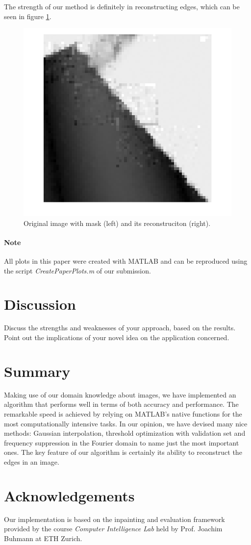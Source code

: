 \documentclass[10pt,conference,compsocconf]{IEEEtran}
\begin{document}
The strength of our method is definitely in reconstructing edges, which can be seen in figure \ref{edge_reconstruction}.

\begin{figure}
\centering
\includegraphics[width=\columnwidth]{images/framing_artifacts.png}
\caption{Original image with mask (left) and its reconstruciton (right).}
\label{edge_reconstruction}
\end{figure}

\paragraph{Note} All plots in this paper were created with MATLAB and can be reproduced using the script \emph{CreatePaperPlots.m} of our submission.

\section{Discussion}
Discuss the strengths and weaknesses of your approach, based on the results. Point out the implications of your novel idea on the application concerned.

\section{Summary}
Making use of our domain knowledge about images, we have implemented an algorithm that performs well in terms of both accuracy and performance. The remarkable speed is achieved by relying on MATLAB's native functions for the most computationally intensive tasks. In our opinion, we have devised many nice methods: Gaussian interpolation, threshold optimization with validation set and frequency suppression in the Fourier domain to name just the most important ones. The key feature of our algorithm is certainly its ability to reconstruct the edges in an image.

\section*{Acknowledgements}
Our implementation is based on the inpainting and evaluation framework provided by the course \emph{Computer Intelligence Lab} held by Prof. Joachim Buhmann at ETH Zurich.



\end{document}
